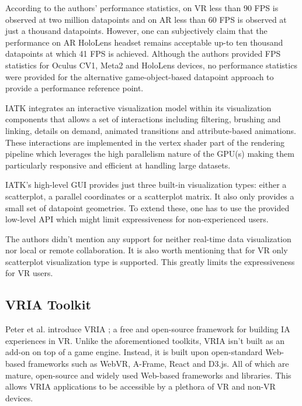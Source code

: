 \documentclass{vgtc}                          %
\begin{document}
According to the authors' performance statistics, on VR less than 90 FPS is
observed at two million datapoints and on AR less than 60 FPS is observed at
just a thousand datapoints. However, one can subjectively claim that the performance on AR
HoloLens headset remains acceptable up-to ten thousand datapoints at which 41
FPS is achieved. Although the authors provided FPS statistics for Oculus CV1,
Meta2 and HoloLens devices, no performance statistics were provided for the
alternative game-object-based datapoint approach to provide a performance
reference point.

IATK integrates an interactive visualization model within its visualization
components that allows a set of interactions including filtering, brushing and
linking, details on demand, animated transitions and attribute-based animations.
These interactions are implemented in the vertex shader part of the rendering
pipeline which leverages the high parallelism nature of the GPU(s) making them
particularly responsive and efficient at handling large datasets.

IATK's high-level GUI provides just three built-in visualization types:
either a scatterplot, a parallel coordinates or a scatterplot matrix. It also
only provides a small set of datapoint geometries. To extend these, one has to
use the provided low-level API which might limit expressiveness for
non-experienced users.

The authors didn't mention any support for neither real-time data
visualization nor local or remote collaboration. It is also worth mentioning
that for VR only scatterplot visualization type is supported. This greatly
limits the expressiveness for VR users.

\subsection{VRIA Toolkit}
Peter et al. introduce VRIA \cite{vria_framework}; a free and open-source
framework for building IA experiences in VR. Unlike the aforementioned
toolkits, VRIA isn't built as an add-on on top of a game engine. Instead, it is
built upon open-standard Web-based frameworks such as WebVR, A-Frame, React and
D3.js. All of which are mature, open-source and widely used Web-based
frameworks and libraries. This allows VRIA applications to be accessible by a
plethora of VR and non-VR devices.

\smallskip
\end{document}
